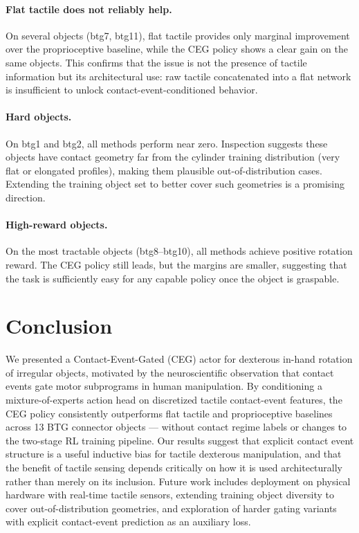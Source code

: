 \documentclass{article}
\begin{document}
\paragraph{Flat tactile does not reliably help.}
On several objects (btg7, btg11), flat tactile provides only marginal improvement over the
proprioceptive baseline, while the CEG policy shows a clear gain on the same objects. This
confirms that the issue is not the presence of tactile information but its architectural use:
raw tactile concatenated into a flat network is insufficient to unlock contact-event-conditioned
behavior.

\paragraph{Hard objects.}
On btg1 and btg2, all methods perform near zero. Inspection suggests these objects have
contact geometry far from the cylinder training distribution (very flat or elongated profiles),
making them plausible out-of-distribution cases. Extending the training object set to better
cover such geometries is a promising direction.

\paragraph{High-reward objects.}
On the most tractable objects (btg8--btg10), all methods achieve positive rotation reward. The
CEG policy still leads, but the margins are smaller, suggesting that the task is sufficiently
easy for any capable policy once the object is graspable.


\section{Conclusion}

We presented a Contact-Event-Gated (CEG) actor for dexterous in-hand rotation of irregular
objects, motivated by the neuroscientific observation that contact events gate motor subprograms
in human manipulation. By conditioning a mixture-of-experts action head on discretized tactile
contact-event features, the CEG policy consistently outperforms flat tactile and proprioceptive
baselines across 13 BTG connector objects — without contact regime labels or changes to the
two-stage RL training pipeline. Our results suggest that explicit contact event structure is a
useful inductive bias for tactile dexterous manipulation, and that the benefit of tactile
sensing depends critically on how it is used architecturally rather than merely on its
inclusion. Future work includes deployment on physical hardware with real-time tactile sensors,
extending training object diversity to cover out-of-distribution geometries, and exploration of
harder gating variants with explicit contact-event prediction as an auxiliary loss.
\end{document}

